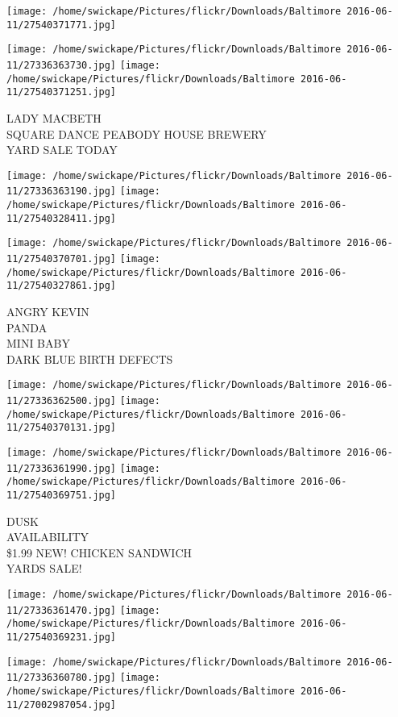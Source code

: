 \documentclass[10pt,letterpaper]{article}
\begin{document}
\texttt{[image: /home/swickape/Pictures/flickr/Downloads/Baltimore 2016-06-11/27540371771.jpg]}

\vspace{0.25in}
\texttt{[image: /home/swickape/Pictures/flickr/Downloads/Baltimore 2016-06-11/27336363730.jpg]}
\texttt{[image: /home/swickape/Pictures/flickr/Downloads/Baltimore 2016-06-11/27540371251.jpg]}

LADY MACBETH\\
SQUARE DANCE PEABODY HOUSE BREWERY\\
YARD SALE TODAY\\
\pagebreak

\texttt{[image: /home/swickape/Pictures/flickr/Downloads/Baltimore 2016-06-11/27336363190.jpg]}
\texttt{[image: /home/swickape/Pictures/flickr/Downloads/Baltimore 2016-06-11/27540328411.jpg]}

\texttt{[image: /home/swickape/Pictures/flickr/Downloads/Baltimore 2016-06-11/27540370701.jpg]}
\texttt{[image: /home/swickape/Pictures/flickr/Downloads/Baltimore 2016-06-11/27540327861.jpg]}

ANGRY KEVIN\\
PANDA\\
MINI BABY\\
DARK BLUE BIRTH DEFECTS\\
\pagebreak

\texttt{[image: /home/swickape/Pictures/flickr/Downloads/Baltimore 2016-06-11/27336362500.jpg]}
\texttt{[image: /home/swickape/Pictures/flickr/Downloads/Baltimore 2016-06-11/27540370131.jpg]}

\texttt{[image: /home/swickape/Pictures/flickr/Downloads/Baltimore 2016-06-11/27336361990.jpg]}
\texttt{[image: /home/swickape/Pictures/flickr/Downloads/Baltimore 2016-06-11/27540369751.jpg]}

DUSK\\
AVAILABILITY\\
\$1.99 NEW!  CHICKEN SANDWICH\\
YARDS SALE!\\
\pagebreak

\texttt{[image: /home/swickape/Pictures/flickr/Downloads/Baltimore 2016-06-11/27336361470.jpg]}
\texttt{[image: /home/swickape/Pictures/flickr/Downloads/Baltimore 2016-06-11/27540369231.jpg]}

\texttt{[image: /home/swickape/Pictures/flickr/Downloads/Baltimore 2016-06-11/27336360780.jpg]}
\texttt{[image: /home/swickape/Pictures/flickr/Downloads/Baltimore 2016-06-11/27002987054.jpg]}
\end{document}
